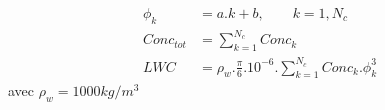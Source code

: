 
\begin{align*}
\phi_k &= a . k + b , \qquad k=1,N_{c}\\
Conc_{tot} &= \sum_{k=1}^{N_{c}} Conc_k \\
LWC &= \rho_w .\frac{\pi}{6}.10^{-6}.
          \sum_{k=1}^{N_{c}} Conc_k.\phi^3_k 
\end{align*}
avec $\rho_w = 1000 kg/m^3$
